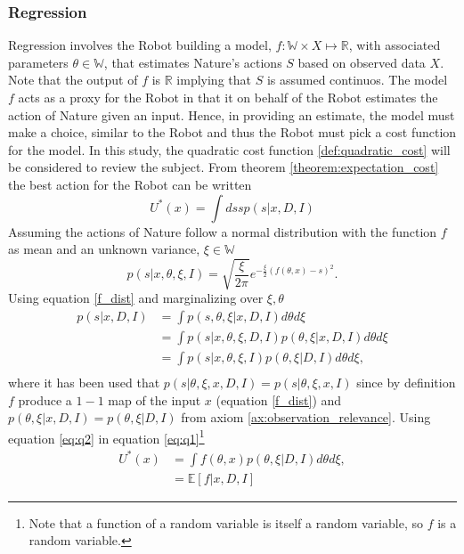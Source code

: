 	\subsubsection{Regression}
	\label{sec:regression}
	Regression involves the Robot building a model, $f: \mathbb{W}\times X\mapsto\mathbb{R}$, with associated parameters $\theta\in \mathbb{W}$, that estimates Nature's actions $S$ based on observed data $X$. Note that the output of $f$ is $\mathbb{R}$ implying that $S$ is assumed continuos. The model $f$ acts as a proxy for the Robot in that it on behalf of the Robot estimates the action of Nature given an input. Hence, in providing an estimate, the model must make a choice, similar to the Robot and thus the Robot must pick a cost function for the model. In this study, the quadratic cost function \ref{def:quadratic_cost} will be considered to review the subject. From theorem \ref{theorem:expectation_cost} the best action for the Robot can be written
	\begin{equation}
		U^*(x) = \int ds s p(s|x,D,I)
		\label{eq:q1}
	\end{equation}
	Assuming the actions of Nature follow a normal distribution with the function $f$ as mean and an unknown variance, $\xi\in \mathbb{W}$
	\begin{equation}
		p(s|x,\theta,\xi,I)=\sqrt{\frac{\xi}{2\pi}} e^{-\frac{\xi}{2}(f(\theta,x)-s)^2}.
		\label{f_dist}
	\end{equation}
	Using equation \eqref{f_dist} and marginalizing over $\xi,\theta$
	\begin{equation}
		\begin{split}
			p(s|x,D,I) &= \int p(s,\theta,\xi|x,D,I) d\theta d\xi\\
			& = \int p(s|x,\theta,\xi,D,I)  p(\theta,\xi|x,D,I)d\theta d\xi\\
			& = \int p(s|x,\theta,\xi,I)  p(\theta,\xi|D,I)d\theta d\xi,\\
		\end{split}
		\label{eq:q2}
	\end{equation}
	where it has been used that $p(s|\theta,\xi,x,D,I) = p(s|\theta,\xi,x,I)$ since by definition $f$ produce a $1-1$ map of the input $x$ (equation \eqref{f_dist}) and $p(\theta,\xi|x,D,I) = p(\theta,\xi|D,I)$ from axiom \ref{ax:observation_relevance}. Using equation \eqref{eq:q2} in equation \eqref{eq:q1}\footnote{Note that a function of a random variable is itself a random variable, so $f$ is a random variable.}
	\begin{equation}
		\begin{split}
			U^*(x) & = \int f(\theta,x)  p(\theta,\xi|D,I) d\theta d\xi,\\
			& = \mathbb{E}[f|x,D,I]
		\end{split}
		\label{eq:q3}
	\end{equation}	
